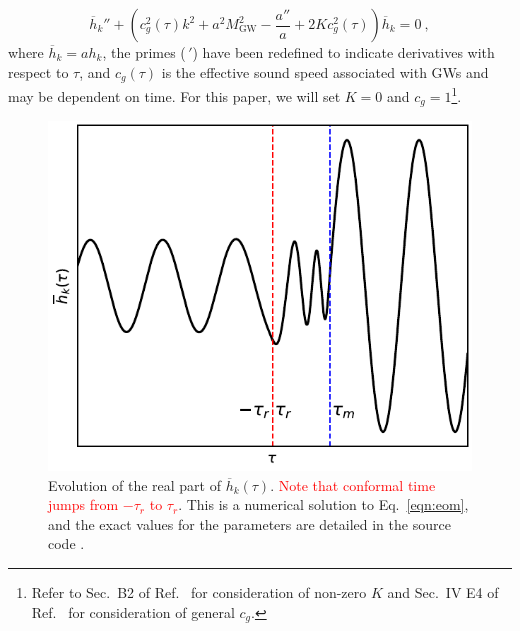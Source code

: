 \documentclass[prd,twocolumn,aps,psfig,nofootinbib,nobibnotes,superscriptaddress,preprintnumbers,times]{revtex4-2}
\def\red{\textcolor{red}}
\begin{document}
\begin{equation}\label{eqn:eom}
    \overline{h}_k'' + \left(c_g^2(\tau) k^2 + a^2 M_\text{GW}^2 - \frac{a''}{a} + 2Kc_g^2(\tau)\right)\overline{h}_k = 0 \ ,
\end{equation}
where $\overline{h}_k = ah_k$, the primes ($\,'$) have been redefined to indicate derivatives with respect to $\tau$, and $c_g(\tau)$ is the effective sound speed associated with GWs and may be dependent on time. For this paper, we will set $K = 0$ and $c_g = 1$\footnote{Refer to Sec.\ B2 of Ref.\ \cite{Gumrukcuoglu:2012wt} for consideration of non-zero $K$ and Sec.\ IV E4 of Ref.\ \cite{Gumrukcuoglu:2012wt} for consideration of general $c_g$.}.

\begin{figure}[t]
\centering
\includegraphics[scale=0.75]{fig1.pdf}
\caption{Evolution of the real part of $\overline{h}_k(\tau)$. \red{Note that conformal time jumps from $-\tau_r$ to $\tau_r$}. This is a numerical solution to Eq.\ \ref{eqn:eom}, and the exact values for the parameters are detailed in the source code \cite{GH}.}
 \label{fig:mode}
\end{figure}
\end{document}
